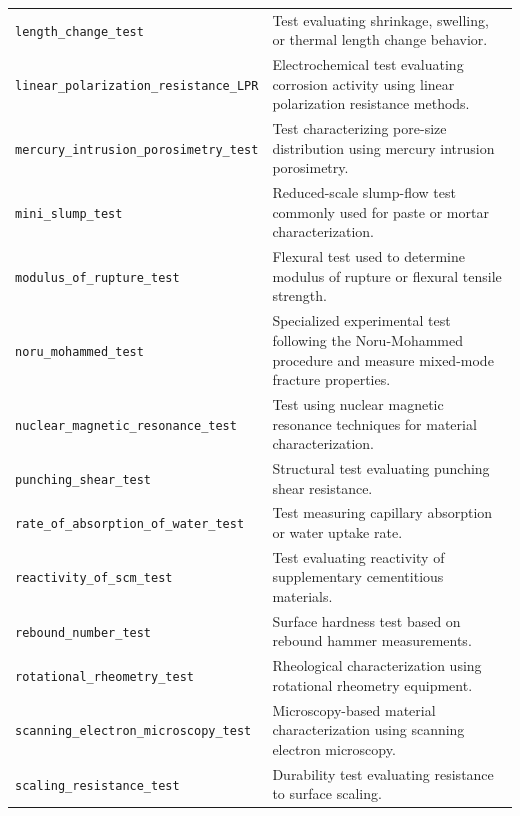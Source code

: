 \documentclass[11pt]{book}
\begin{document}
{\begin{longtable}{p{}p{}}
\texttt{length\_change\_test} &
Test evaluating shrinkage, swelling, or thermal length change behavior. \\

\texttt{linear\_polarization\_resistance\_LPR} &
Electrochemical test evaluating corrosion activity using linear polarization resistance methods. \\

\texttt{mercury\_intrusion\_porosimetry\_test} &
Test characterizing pore-size distribution using mercury intrusion porosimetry. \\

\texttt{mini\_slump\_test} &
Reduced-scale slump-flow test commonly used for paste or mortar characterization. \\

\texttt{modulus\_of\_rupture\_test} &
Flexural test used to determine modulus of rupture or flexural tensile strength. \\

\texttt{noru\_mohammed\_test} &
Specialized experimental test following the Noru-Mohammed procedure and measure mixed-mode fracture properties. \\

\texttt{nuclear\_magnetic\_resonance\_test} &
Test using nuclear magnetic resonance techniques for material characterization. \\

\texttt{punching\_shear\_test} &
Structural test evaluating punching shear resistance. \\

\texttt{rate\_of\_absorption\_of\_water\_test} &
Test measuring capillary absorption or water uptake rate. \\

\texttt{reactivity\_of\_scm\_test} &
Test evaluating reactivity of supplementary cementitious materials. \\

\texttt{rebound\_number\_test} &
Surface hardness test based on rebound hammer measurements. \\

\texttt{rotational\_rheometry\_test} &
Rheological characterization using rotational rheometry equipment. \\

\texttt{scanning\_electron\_microscopy\_test} &
Microscopy-based material characterization using scanning electron microscopy. \\

\texttt{scaling\_resistance\_test} &
Durability test evaluating resistance to surface scaling. \\


\end{longtable}}
\end{document}
